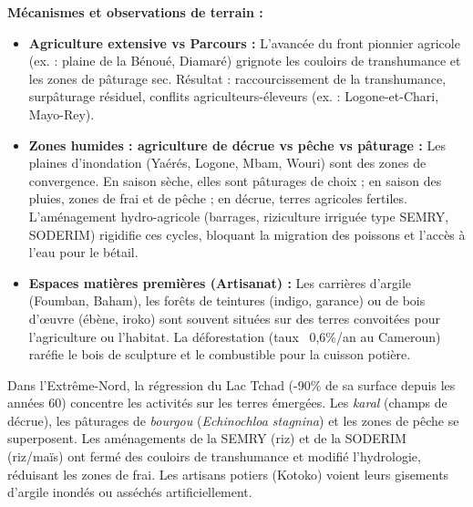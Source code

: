 \documentclass[11pt]{article}
\begin{document}
\noindent\textbf{Mécanismes et observations de terrain :}
\begin{itemize}
    \item \textbf{Agriculture extensive vs Parcours :} L'avancée du front pionnier agricole (ex. : plaine de la Bénoué, Diamaré) grignote les couloirs de transhumance et les zones de pâturage sec. Résultat : raccourcissement de la transhumance, surpâturage résiduel, conflits agriculteurs-éleveurs (ex. : Logone-et-Chari, Mayo-Rey).
    \item \textbf{Zones humides : agriculture de décrue vs pêche vs pâturage :} Les plaines d'inondation (Yaérés, Logone, Mbam, Wouri) sont des zones de convergence. En saison sèche, elles sont pâturages de choix ; en saison des pluies, zones de frai et de pêche ; en décrue, terres agricoles fertiles. L'aménagement hydro-agricole (barrages, riziculture irriguée type SEMRY, SODERIM) rigidifie ces cycles, bloquant la migration des poissons et l'accès à l'eau pour le bétail.
    \item \textbf{Espaces matières premières (Artisanat) :} Les carrières d'argile (Foumban, Baham), les forêts de teintures (indigo, garance) ou de bois d'œuvre (ébène, iroko) sont souvent situées sur des terres convoitées pour l'agriculture ou l'habitat. La déforestation (taux ~0,6\%/an au Cameroun) raréfie le bois de sculpture et le combustible pour la cuisson potière.
\end{itemize}

\begin{exemplebox}
Dans l'Extrême-Nord, la régression du Lac Tchad (-90\% de sa surface depuis les années 60) concentre les activités sur les terres émergées. Les \emph{karal} (champs de décrue), les pâturages de \emph{bourgou} (\textit{Echinochloa stagnina}) et les zones de pêche se superposent. Les aménagements de la SEMRY (riz) et de la SODERIM (riz/maïs) ont fermé des couloirs de transhumance et modifié l'hydrologie, réduisant les zones de frai. Les artisans potiers (Kotoko) voient leurs gisements d'argile inondés ou asséchés artificiellement.
\end{exemplebox}
\end{document}
